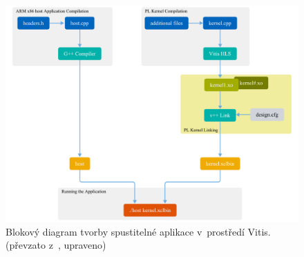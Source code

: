 \documentclass[a4paper, twoside, 11pt]{article}
\begin{document}
		\begin{figure}[htbp!]
			\centering
			\includegraphics[width=1\textwidth]{src/pdf/vitis-development-flow.pdf}
			\caption{Blokový diagram tvorby spustitelné aplikace v~prostředí Vitis. (převzato z~\cite{vitis-unified-software-platform-documentation-2022}, upraveno)}
			\label{fig:vitis-development-flow}
		\end{figure}
		
\end{document}

